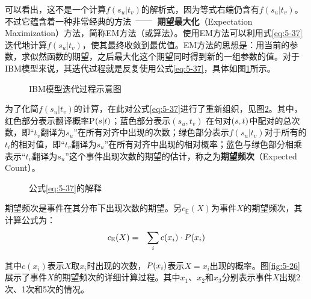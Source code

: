 \parinterval  可以看出，这不是一个计算$f(s_u|t_v)$的解析式，因为等式右端仍含有$f(s_u|t_v)$。不过它蕴含着一种非常经典的方法\ $\dash$\ {\small\sffamily\bfseries{期望最大化}}（Expectation Maximization）方法，简称EM方法（或算法）。使用EM方法可以利用式\ref{eq:5-37}迭代地计算$f(s_u|t_v)$，使其最终收敛到最优值。EM方法的思想是：用当前的参数，求似然函数的期望，之后最大化这个期望同时得到新的一组参数的值。对于IBM模型来说，其迭代过程就是反复使用公式\eqref{eq:5-37}，具体如图\ref{fig:5-24}所示。

\begin{figure}[htp]
    \centering

   \caption{IBM模型迭代过程示意图}
   \label{fig:5-24}
\end{figure}

\parinterval 为了化简$f(s_u|t_v)$的计算，在此对公式\eqref{eq:5-37}进行了重新组织，见图\ref{fig:5-25}。其中，红色部分表示翻译概率P$({s}|{t})$；蓝色部分表示$(s_u,t_v)$ 在句对$({s},{t})$中配对的总次数，即“$t_v$翻译为$s_u$”在所有对齐中出现的次数；绿色部分表示$f(s_u|t_v)$对于所有的$t_i$的相对值，即“$t_v$翻译为$s_u$”在所有对齐中出现的相对概率；蓝色与绿色部分相乘表示“$t_v$翻译为$s_u$”这个事件出现次数的期望的估计，称之为{\small\sffamily\bfseries{期望频次}}（Expected Count）。
\vspace{-0.3em}
\begin{figure}[htp]
    \centering

   \caption{公式\eqref{eq:5-37}的解释}
   \label{fig:5-25}
\end{figure}

\parinterval 期望频次是事件在其分布下出现次数的期望。另$c_{\mathbb{E}}(X)$为事件$X$的期望频次，其计算公式为：
\vspace{-0.5em}
\begin{eqnarray}
c_{\mathbb{E}}(X)&=&\sum_i c(x_i) \cdot {P}(x_i)
\label{eq:5-38}
\end{eqnarray}

\vspace{-0.5em}
\noindent 其中$c(x_i)$表示$X$取$x_i$时出现的次数，${P}(x_i)$表示$X=x_i$出现的概率。图\ref{fig:5-26}展示了事件$X$的期望频次的详细计算过程。其中$x_1$、$x_2$和$x_3$分别表示事件$X$出现2次、1次和5次的情况。


